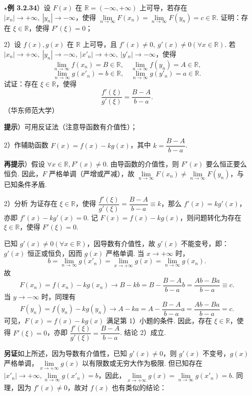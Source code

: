 \documentclass[UTF8,12pt,a4paper,fontset=fandol]{ctexart}
\begin{document}
\noindent\textbf{$\star$例 3.2.34}）设 $F(x)$ 在 $\mathbb{R}=(-\infty,+\infty)$ 上可导，若存在 $|x_n|\to+\infty,\ |y_n|\to-\infty$，使得 $\lim\limits_{n\to\infty}F(x_n)=\lim\limits_{n\to\infty}F(y_n)=c\in\mathbb{R}$. 证明：存在 $\xi\in\mathbb{R}$，使得 $F'(\xi)=0$；

2）设 $f(x),g(x)$ 在 $\mathbb{R}$ 上可导，且 $f'(x)\ne0,\ g'(x)\ne0(\forall x\in\mathbb{R})$. 若 $|x_n|\to+\infty,\ |y_n|\to-\infty,\ |x'_n|\to+\infty,\ |y'_n|\to-\infty$，使得
\[
  \lim_{n\to\infty}f(x_n)=B\in\mathbb{R},\quad
  \lim_{n\to\infty}f(y_n)=A\in\mathbb{R},
\]
\[
  \lim_{n\to\infty}g(x'_n)=b\in\mathbb{R},\quad
  \lim_{n\to\infty}g(y'_n)=a\in\mathbb{R}.
\]
试证：存在 $\xi\in\mathbb{R}$，使得
\[
  \frac{f'(\xi)}{g'(\xi)}=\frac{B-A}{b-a}.
\]
（华东师范大学）

\noindent\textbf{提示}）可用反证法（注意导函数有介值性）；

2）作辅助函数 $F(x)=f(x)-kg(x)$，其中 $k=\dfrac{B-A}{b-a}$.

\noindent\textbf{再提示}）假设 $\forall x\in\mathbb{R},F'(x)\ne0$. 由导函数的介值性，则 $F'(x)$ 要么恒正要么恒负. 因此，$F$ 严格单调（严增或严减），故 $\lim\limits_{n\to\infty}F(x_n)\ne\lim\limits_{n\to\infty}F(y_n)$，与已知条件矛盾.

2）分析 为证存在 $\xi\in\mathbb{R}$，使得 $\dfrac{f'(\xi)}{g'(\xi)}=\dfrac{B-A}{b-a}\equiv k$，那么 $f'(x)=kg'(x)$，亦即 $f'(x)-kg'(x)=0$. 记 $F(x)=f(x)-kg(x)$，则问题转化为存在 $\xi\in\mathbb{R}$，使得 $F'(\xi)=0$.

已知 $g'(x)\ne0(\forall x\in\mathbb{R})$，因导数有介值性，故 $g'(x)$ 不能变号，即：$g'(x)$ 恒正或恒负，因而 $g(x)$ 严格单调. 当 $x\to+\infty$ 时，
\[
  b=\lim_{n\to\infty}g(x'_n)=\lim_{x\to+\infty}g(x)=\lim_{n\to\infty}g(x_n).
\]
故
\[
  F(x_n)=f(x_n)-kg(x_n)\to B-kb
  =
  B-\frac{B-A}{b-a}b
  =
  \frac{Ab-Ba}{b-a}\equiv c.
\]
当 $y\to-\infty$ 时，同理有
\[
  F(y_n)=f(y_n)-kg(y_n)\to A-ka
  =
  A-\frac{B-A}{b-a}a
  =
  \frac{Ab-Ba}{b-a}=c.
\]
可见，$F(x)=f(x)-kg(x)$ 满足第 1）小题的条件. 因此，存在 $\xi\in\mathbb{R}$，使得 $F'(\xi)=0$，亦即 $\dfrac{f'(\xi)}{g'(\xi)}=\dfrac{B-A}{b-a}$. 结论 2）成立.

\noindent\textbf{另证}\quad 如上所述，因为导数有介值性，已知 $g'(x)\ne0$，则 $g'(x)$ 不变号，$g(x)$ 严格单调，$\lim\limits_{x\to+\infty}g(x)$ 以有限数或无穷大作为极限. 但已知存在 $|x'_n|\to+\infty,\lim\limits_{n\to\infty}g(x'_n)=b$，因此，$\lim\limits_{x\to+\infty}g(x)=\lim\limits_{n\to\infty}g(x'_n)=b$. 同理，因为 $f'(x)\ne0$，故对 $f(x)$ 也有类似的结论：
\end{document}
